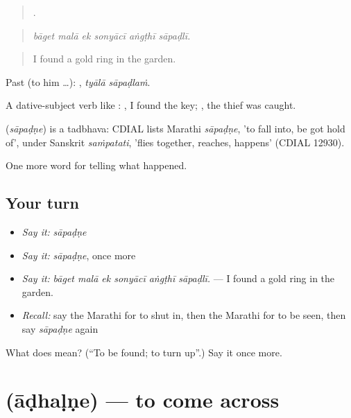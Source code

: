 \begin{quote}
     .
\end{quote}

\begin{quote}
\emph{bāget malā ek sonyācī aṅgṭhī sāpaḍlī.}
\end{quote}

\begin{quote}
I found a gold ring in the garden.
\end{quote}

Past (to him …):  , \emph{tyālā sāpaḍlaṁ}.

A dative-subject verb like :   , I found the key;  , the thief was caught.

\begin{cousinweb}
\textbf{} (\emph{sāpaḍṇe}) is a tadbhava: CDIAL lists Marathi \emph{sāpaḍṇe}, 'to fall into, be got hold of', under Sanskrit \emph{saṁpatati}, 'flies together, reaches, happens' (CDIAL 12930).
\end{cousinweb}

\begin{grammarlens}[title={What you've built}]
One more word for telling what happened.
\end{grammarlens}

\subsection*{Your turn}
\begin{itemize}
\raggedright
  \item \emph{Say it:} \emph{sāpaḍṇe}
  \item \emph{Say it:} \emph{sāpaḍṇe}, once more
  \item \emph{Say it:} \emph{bāget malā ek sonyācī aṅgṭhī sāpaḍlī.} — I found a gold ring in the garden.
  \item \emph{Recall:} say the Marathi for to shut in, then the Marathi for to be seen, then say \emph{sāpaḍṇe} again
\end{itemize}

\begin{tcolorbox}[breakable,colback=teal!4,colframe=teal!35!black,title={Before you move on}]
What does  mean? (\textquotedblleft{}To be found; to turn up\textquotedblright{}.) Say it once more.
\end{tcolorbox}
\section[\texorpdfstring{\mr{आढळणे} (āḍhaḷṇe)}{आढळणे (āḍhaḷṇe)}]{ (āḍhaḷṇe) — to come across}

